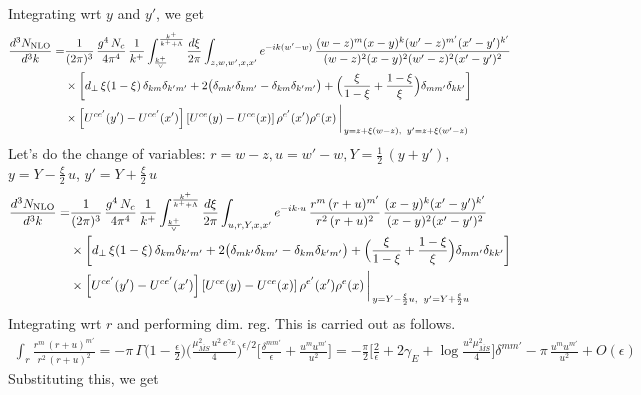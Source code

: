 \documentclass[9pt]{article}
\numberwithin{equation}{section}
\begin{document}
Integrating wrt $y$ and $y'$, we get
\begin{align}
\frac{d^{3}N_{\rm NLO}}{d^{3}k}= &\frac{1}{(2\pi)^{3}}\,\frac{g^{4}\,N_{c}}{4\pi^{4}}\,\frac{1}{k^{+}}\int_{\frac{k^{+}}{\vee}}^{\frac{k^{+}}{k^{+}+\Lambda}}\frac{d\xi}{2\pi}\int_{z,w,w',x,x'}e^{-ik(w'-w)}\,\frac{(w-z)^{m}(x-y)^{k}(w'-z)^{m'}(x'-y')^{k'}}{(w-z)^{2}(x-y)^{2}(w'-z)^{2}(x'-y')^{2}}\notag\\
&\times\bigg[d_{\perp}\,\xi(1-\xi)\,\delta_{km}\delta_{k'm'}+2\big(\delta_{mk'}\delta_{km'}-\delta_{km}\delta_{k'm'}\big)+\Big(\frac{\xi}{1-\xi}+\frac{1-\xi}{\xi}\Big)\delta_{mm'}\delta_{kk'}\bigg]\notag\\
&\times\left[U^{ce'}(y') - U^{ce'}(x')\right]\left[U^{ce}(y) - U^{ce}(x)\right]\rho^{e'}(x')\rho^{e}(x)\,\bigg|_{\,y=z+\xi(w-z),\;\;y'=z+\xi(w'-z)}
\end{align}
Let's do the change of variables: $r = w-z, u = w'-w, Y = \frac{1}{2}\, (y+y')$, $y = Y - \frac{\xi}{2}\,u$, $y' = Y +\frac{\xi}{2}\,u$
\begin{align}
\frac{d^{3}N_{\rm NLO}}{d^{3}k}= &\frac{1}{(2\pi)^{3}}\,\frac{g^{4}\,N_{c}}{4\pi^{4}}\,\frac{1}{k^{+}}\int_{\frac{k^{+}}{\vee}}^{\frac{k^{+}}{k^{+}+\Lambda}}\frac{d\xi}{2\pi}\int_{u,r,Y,x,x'}e^{-ik\cdot u}\,\frac{r^{m}\,(r+u)^{m'}}{r^{2}\,(r+u)^{2}}\,\frac{(x-y)^{k}(x'-y')^{k'}}{(x-y)^{2}(x'-y')^{2}}\notag\\
&\times\bigg[d_{\perp}\,\xi(1-\xi)\,\delta_{km}\delta_{k'm'}+2\big(\delta_{mk'}\delta_{km'}-\delta_{km}\delta_{k'm'}\big)+\Big(\frac{\xi}{1-\xi}+\frac{1-\xi}{\xi}\Big)\delta_{mm'}\delta_{kk'}\bigg]\notag\\
&\times\left[U^{ce'}(y') - U^{ce'}(x')\right]\left[U^{ce}(y) - U^{ce}(x)\right]\rho^{e'}(x')\rho^{e}(x)\,\bigg|_{\,y=Y-\frac{\xi}{2}u,\;\;y'=Y+\frac{\xi}{2}u}
\end{align}
Integrating wrt $r$ and performing dim. reg. This is carried out as follows.
\begin{align}
\int_{r}\frac{r^{m}\,(r+u)^{m'}}{r^{2}\,(r+u)^{2}}
=-\pi\,\Gamma\big(1-\tfrac{\epsilon}{2}\big)\Big(\frac{\mu^{2}_{\overline{MS}}\,u^{2}\,e^{\gamma_E}}{4}\Big)^{\epsilon/2}\Big[\frac{\delta^{mm'}}{\epsilon}+\frac{u^{m}u^{m'}}{u^{2}}\Big]
=-\frac{\pi}{2}\Big[\frac{2}{\epsilon}+2\gamma_{E}+\log\frac{u^{2}\mu^{2}_{\overline{MS}}}{4}\Big]\delta^{mm'}-\pi\,\frac{u^{m}u^{m'}}{u^{2}}+O(\epsilon)
\end{align}
Substituting this, we get
\end{document}
